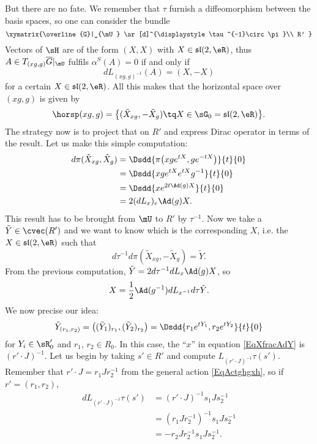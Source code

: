 But there are no fate. We remember that $\tau$ furnish a diffeomorphism between the basis spaces, so one can consider the bundle 
\[ 
  \xymatrix{%
   \overline{G}|_{\mU} \ar[d]^{\displaystyle\tau^{-1}\circ\pi}\\        
   R'
}
\]
Vectors of $\sH$ are of the form $(X,X)$ with $X\in\mathfrak{sl}(2,\eR)$, thus $A\in T_{(xg,g)}\overline{G}|_{\mU}$ fulfils $\alpha^{S}(A)=0$ if and only if
\[ 
  dL_{(xg,g)^{-1}}(A)=(X,-X)
\]
for a certain $X\in \mathfrak{sl}(2,\eR)$. All this makes that the horizontal space over $(xg,g)$ is given by
\begin{equation}
\horsp(xg,g)=\big\{ (\tilde X_{xg},-\tilde X_{g})\tq X\in \sG_0=\mathfrak{sl}(2,\eR) \big\}.
\end{equation}
The strategy now is to project that on $R'$ and express Dirac operator in terms of the result. Let us make this simple computation:
\begin{align*}
d\pi(\tilde X_{xg},\tilde X_{g})&=\Dsdd{ \pi\big( xg e^{tX},g e^{-tX} \big) }{t}{0}\\
        &=\Dsdd{ xg e^{tX} e^{tX}g^{-1} }{t}{0}\\
        &=\Dsdd{ x e^{2t\Ad(g)X} }{t}{0}\\
        &=2(dL_{x})_{e}\Ad(g)X.
\end{align*}
This result has to be brought from $\mU$ to $R'$ by $\tau^{-1}$. Now we take a $\tilde Y\in\cvec(R')$ and we want to know which is the corresponding $X$, i.e. the $X\in\mathfrak{sl}(2,\eR)$ such that
\[ 
  d\tau^{-1}d\pi(\tilde X_{xg},-\tilde X_{g})=\tilde Y.
\]
From the previous computation, $\tilde Y=2d\tau^{-1}dL_{x}\Ad(g)X$, so
\begin{equation}  \label{EqXfracAdY}
  X=\frac{ 1 }{2}\Ad(g^{-1})dL_{x^{-1}}d\tau\tilde Y. 
\end{equation}
We now precise our idea: 
\begin{equation}   \label{EqtildeYrunrdeux}
  \tilde Y_{(r_{1},r_2)}=\big(    (\tilde Y_{1})_{r_1},(\tilde Y_{2})_{r_2}   \big)=\Dsdd{ r_1 e^{tY_{1}},r_2 e^{tY_{2}} }{t}{0}
\end{equation}
for $Y_{i}\in\sR'_{0}$ and $r_1$, $r_2\in R_{0}$. In this case, the ``$x$'' in equation \eqref{EqXfracAdY} is $(r'\cdot J)^{-1}$. Let us begin by taking $s'\in R'$ and compute $L_{(r'\cdot J)^{-1}}\tau(s')$. Remember that $r'\cdot J=r_1Jr_2^{-1}$ from the general action \eqref{EqActghgxh}, so if $r'=(r_1,r_2)$,
\begin{align*}
  dL_{(r'\cdot J)^{-1}}\tau(s')&=(r'\cdot J)^{-1}s_1 Js_2^{-1}\\
        &=(r_1Jr_2^{-1})^{-1}s_1Js_2^{-1}\\
        &=-r_2Jr_2^{-1}s_1Js_2^{-1}.
\end{align*}
